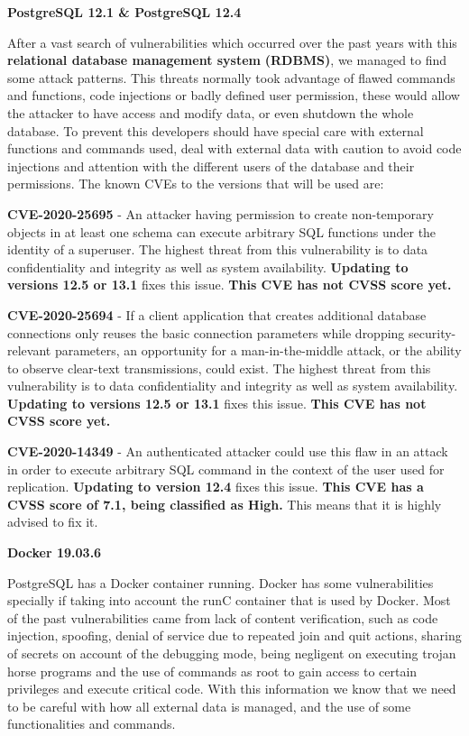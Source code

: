 \vspace{0.4cm}

\textbf{PostgreSQL 12.1 \& PostgreSQL 12.4}

After a vast search of vulnerabilities which occurred over the past years with this \textbf{relational database management system} \textbf{(RDBMS)}, we managed to find some attack patterns. This threats normally took advantage of flawed commands and functions, code injections or badly defined user permission, these would allow the attacker to have access and modify data, or even shutdown the whole database. To prevent this developers should have special care with external functions and commands used, deal with external data with caution to avoid code injections and attention with the different users of the database and their permissions. The known CVEs to the versions that will be used are:

\textbf{CVE-2020-25695} - An attacker having permission to create non-temporary objects in at least one schema can execute arbitrary SQL functions under the identity of a superuser. The highest threat from this vulnerability is to data confidentiality and integrity as well as system availability.\cite{postgres1} \textbf{Updating to versions 12.5 or 13.1} fixes this issue. \textbf{This CVE has not CVSS score yet.}

\textbf{CVE-2020-25694} -  If a client application that creates additional database connections only reuses the basic connection parameters while dropping security-relevant parameters, an opportunity for a man-in-the-middle attack, or the ability to observe clear-text transmissions, could exist. The highest threat from this vulnerability is to data confidentiality and integrity as well as system availability.\cite{postgres2} \textbf{Updating to versions 12.5 or 13.1} fixes this issue. \textbf{This CVE has not CVSS score yet.}

\textbf{CVE-2020-14349} -  An authenticated attacker could use this flaw in an attack in order to execute arbitrary SQL command in the context of the user used for replication.\cite{postgres3} \textbf{Updating to version 12.4} fixes this issue. \textbf{This CVE has a CVSS score of 7.1, being classified as High.} This means that it is highly advised to fix it.


\vspace{0.4cm}

\textbf{Docker 19.03.6}

PostgreSQL has a Docker container running. Docker has some vulnerabilities specially if taking into account the runC container that is used by Docker. Most of the past vulnerabilities came from lack of content verification, such as code injection, spoofing, denial of service due to repeated join and quit actions, sharing of secrets on account of the debugging mode, being negligent on executing trojan horse programs and the use of commands as root to gain access to certain privileges and execute critical code. With this information we know that we need to be careful with how all external data is managed, and the use of some functionalities and commands.

